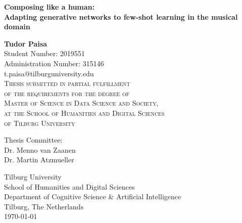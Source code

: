 \documentclass[a4paper]{book}
\begin{document}
\begin{titlepage}
    \begin{center}
        \huge\textbf{Composing like a human:} \\
        \Large\textbf{Adapting generative networks to few-shot learning in the musical domain}
        \normalsize

        \vspace{1cm}

        \textbf{Tudor Paisa}\\
        Student Number: 2019551 \\
        Administration Number: 315146\\
        t.paisa@tilburguniversity.edu\\

        \vspace{1cm}
        \textsc{Thesis submitted in partial fulfillment\\
        of the requirements for the degree of\\
        Master of Science in Data Science and Society,\\
        at the School of Humanities and Digital Sciences\\
        of Tilburg University\\}

        \vspace{2cm}
        Thesis Committee:\\
        Dr. Menno van Zaanen\\
        Dr. Martin Atzmueller\\
        \vfill

        Tilburg University\\
        School of Humanities and Digital Sciences\\
        Department of Cognitive Science \& Artificial Intelligence\\
        Tilburg, The Netherlands\\
        \today
 
    \end{center}
\end{titlepage}

\cleardoublepage
\begin{center}
    \vspace*{\fill}
\begin{figure}[ht]
    \centering
    \def\svgwidth{\linewidth}
    
\end{figure}
    \vspace{1em}
\end{center}
\end{document}
